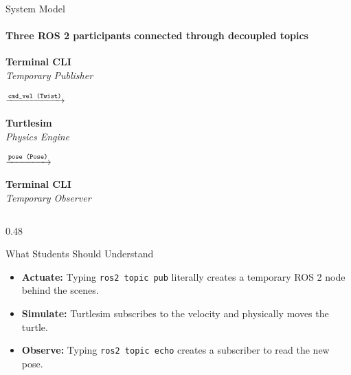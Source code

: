\begin{frame}[fragile]{System Model}
\framesubtitle{Three ROS 2 participants connected through decoupled topics}

\footnotesize

\begin{center}
    \scriptsize
    
    \colorbox{um6p-color-light-blue!40}{
        \parbox[c][1.0cm][c]{2.5cm}{
            \centering
            \textbf{Terminal CLI}\\
            \textit{Temporary Publisher}
        }
    }
    \quad
    $\xrightarrow{\text{\texttt{cmd\_vel (Twist)}}}$
    \quad
    \colorbox{um6p-color-dark-green!20}{
        \parbox[c][1.0cm][c]{2.0cm}{
            \centering
            \textbf{Turtlesim}\\
            \textit{Physics Engine}
        }
    }
    \quad
    $\xrightarrow{\text{\texttt{pose (Pose)}}}$
    \quad
    \colorbox{um6p-color-light-blue!40}{
        \parbox[c][1.0cm][c]{2.5cm}{
            \centering
            \textbf{Terminal CLI}\\
            \textit{Temporary Observer}
        }
    }
    
\end{center}

\vspace{0.4cm}
\pause

\begin{columns}[T,onlytextwidth]

    \begin{column}{0.48\textwidth}
        \begin{block}{What Students Should Understand}
            \begin{itemize}
                \setlength{\itemsep}{0.25em}
                \item \textbf{Actuate:} Typing \texttt{ros2 topic pub} literally creates a temporary ROS 2 node behind the scenes.
                \item \textbf{Simulate:} Turtlesim subscribes to the velocity and physically moves the turtle.
                \item \textbf{Observe:} Typing \texttt{ros2 topic echo} creates a subscriber to read the new pose.
            \end{itemize}
        \end{block}
    \end{column}


\end{columns}
\end{frame}
